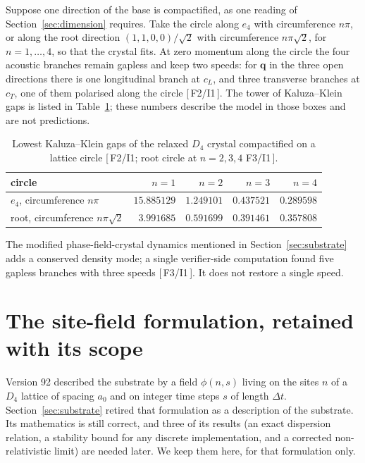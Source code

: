 \documentclass[a4paper,11pt]{article}
\let\jsOldToprule\toprule
\renewcommand{\toprule}{\jsOldToprule\rowcolor{bgheader}}
\numberwithin{equation}{section}
\theoremstyle{jsplain}
\theoremstyle{jsrem}
\newcommand{\grade}[1]{[\,#1\,]}
\begin{document}
Suppose one direction of the base is compactified, as one reading of Section~\ref{sec:dimension} requires. Take the circle along $e_4$ with circumference $n\pi$, or along the root direction $(1,1,0,0)/\sqrt2$ with circumference $n\pi\sqrt2$, for $n=1,\dots,4$, so that the crystal fits. At zero momentum along the circle the four acoustic branches remain gapless and keep two speeds: for $\mathbf{q}$ in the three open directions there is one longitudinal branch at $c_L$, and three transverse branches at $c_T$, one of them polarised along the circle \grade{F2/I1}. The tower of Kaluza--Klein gaps is listed in Table~\ref{tab:kk}; these numbers describe the model in those boxes and are not predictions.

\begin{table}[htbp]
\centering
\begin{tabular}{lrrrr}
\toprule
circle & $n=1$ & $n=2$ & $n=3$ & $n=4$\\
\midrule
$e_4$, circumference $n\pi$ & $15.885129$ & $1.249101$ & $0.437521$ & $0.289598$\\
root, circumference $n\pi\sqrt2$ & $3.991685$ & $0.591699$ & $0.391461$ & $0.357808$\\
\bottomrule
\end{tabular}
\caption{Lowest Kaluza--Klein gaps of the relaxed $D_4$ crystal compactified on a lattice circle \grade{F2/I1; root circle at $n=2,3,4$ F3/I1}.}
\label{tab:kk}
\end{table}

The modified phase-field-crystal dynamics mentioned in Section~\ref{sec:substrate} adds a conserved density mode; a single verifier-side computation found five gapless branches with three speeds \grade{F3/I1}. It does not restore a single speed.

\section{The site-field formulation, retained with its scope}\label{sec:legacy}

Version 92 described the substrate by a field $\phi(n,s)$ living on the sites $n$ of a $D_4$ lattice of spacing $a_0$ and on integer time steps $s$ of length $\Delta t$. Section~\ref{sec:substrate} retired that formulation as a description of the substrate. Its mathematics is still correct, and three of its results (an exact dispersion relation, a stability bound for any discrete implementation, and a corrected non-relativistic limit) are needed later. We keep them here, for that formulation only.
\end{document}
